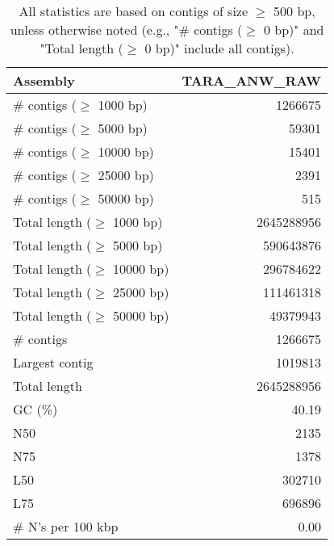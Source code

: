 \documentclass[12pt,a4paper]{article}
\begin{document}
\begin{table}[ht]
\begin{center}
\caption{All statistics are based on contigs of size $\geq$ 500 bp, unless otherwise noted (e.g., "\# contigs ($\geq$ 0 bp)" and "Total length ($\geq$ 0 bp)" include all contigs).}
\begin{tabular}{|l*{1}{|r}|}
\hline
Assembly & TARA\_ANW\_RAW \\ \hline
\# contigs ($\geq$ 1000 bp) & 1266675 \\ \hline
\# contigs ($\geq$ 5000 bp) & 59301 \\ \hline
\# contigs ($\geq$ 10000 bp) & 15401 \\ \hline
\# contigs ($\geq$ 25000 bp) & 2391 \\ \hline
\# contigs ($\geq$ 50000 bp) & 515 \\ \hline
Total length ($\geq$ 1000 bp) & 2645288956 \\ \hline
Total length ($\geq$ 5000 bp) & 590643876 \\ \hline
Total length ($\geq$ 10000 bp) & 296784622 \\ \hline
Total length ($\geq$ 25000 bp) & 111461318 \\ \hline
Total length ($\geq$ 50000 bp) & 49379943 \\ \hline
\# contigs & 1266675 \\ \hline
Largest contig & 1019813 \\ \hline
Total length & 2645288956 \\ \hline
GC (\%) & 40.19 \\ \hline
N50 & 2135 \\ \hline
N75 & 1378 \\ \hline
L50 & 302710 \\ \hline
L75 & 696896 \\ \hline
\# N's per 100 kbp & 0.00 \\ \hline
\end{tabular}
\end{center}
\end{table}
\end{document}
